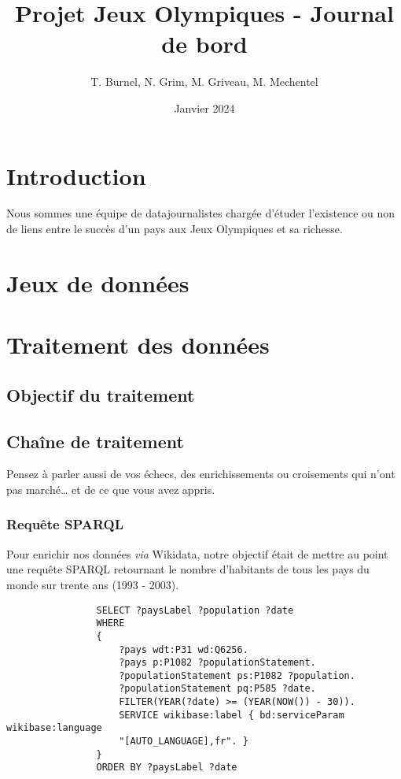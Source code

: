 \documentclass[hidelinks, 12pt]{article}
\title{Projet Jeux Olympiques - Journal de bord}
\date{Janvier 2024}
\author{T. Burnel, N. Grim, M. Griveau, M. Mechentel}
\begin{document}
	\maketitle
	
	\section{Introduction}
	
	
	Nous sommes une équipe de datajournalistes chargée d'étuder l'existence ou non de liens entre le succès d'un pays aux Jeux Olympiques et sa richesse.
	
	\section{Jeux de données}	
	
	\section{Traitement des données}
	
		\subsection{Objectif du traitement}
		
		\subsection{Chaîne de traitement}
		
		Pensez à parler aussi de vos échecs, des enrichissements ou croisements qui n’ont pas marché… et de ce que vous avez appris.
		
			\subsubsection{Requête SPARQL}
			
			Pour enrichir nos données \emph{via} Wikidata, notre objectif était de mettre au point une requête SPARQL retournant le nombre d'habitants de tous les pays du monde sur trente ans (1993 - 2003).
			
			\begin{verbatim}
				SELECT ?paysLabel ?population ?date
				WHERE
				{
					?pays wdt:P31 wd:Q6256.
					?pays p:P1082 ?populationStatement.
					?populationStatement ps:P1082 ?population.
					?populationStatement pq:P585 ?date.
					FILTER(YEAR(?date) >= (YEAR(NOW()) - 30)).
					SERVICE wikibase:label { bd:serviceParam wikibase:language 
					"[AUTO_LANGUAGE],fr". }
				}
				ORDER BY ?paysLabel ?date
			\end{verbatim}
		
\end{document}
